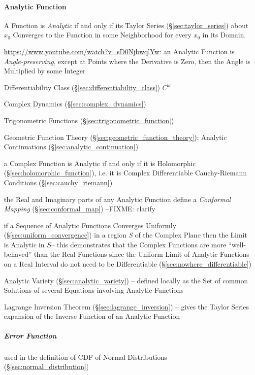 \paragraph{Analytic Function}\label{sec:analytic_function}\hfill

A Function is \emph{Analytic} if and only if its Taylor Series
(\S\ref{sec:taylor_series}) about $x_0$ Converges to the Function in some
Neighborhood for every $x_0$ in its Domain.

\url{https://www.youtube.com/watch?v=sD0NjbwqlYw}: an Analytic Function is
\emph{Angle-preserving}, except at Points where the Derivative is Zero, then the
Angle is Multiplied by some Integer

Differentiability Class (\S\ref{sec:differentiability_class}) $C^{\omega}$

Complex Dynamics (\S\ref{sec:complex_dynamics})

Trigonometric Functions (\S\ref{sec:trigonometric_function})

\fist Geometric Function Theory (\S\ref{sec:geometric_function_theory});
Analytic Continuations (\S\ref{sec:analytic_continuation})

a Complex Function is Analytic if and only if it is Holomorphic
(\S\ref{sec:holomorphic_function}), i.e. it is Complex Differentiable \fist
Cauchy-Riemann Conditions (\S\ref{sec:cauchy_riemann})

the Real and Imaginary parts of any Analytic Function define a \emph{Conformal
  Mapping} (\S\ref{sec:conformal_map}) --FIXME: clarify

if a Sequence of Analytic Functions Converges Uniformly
(\S\ref{sec:uniform_convergence}) in a region $S$ of the Complex Plane then the
Limit is Analytic in $S$-- this demonstrates that the Complex Functions are
more ``well-behaved'' than the Real Functions since the Uniform Limit of
Analytic Functions on a Real Interval do not need to be Differentiable
(\S\ref{sec:nowhere_differentiable})

Analytic Variety (\S\ref{sec:analytic_variety}) -- defined locally as the Set of
common Solutions of several Equations involving Analytic Functions

Lagrange Inversion Theorem (\S\ref{sec:lagrange_inversion}) -- gives the Taylor
Series expansion of the Inverse Function of an Analytic Function



\subparagraph{Error Function}\label{sec:error_function}\hfill

used in the definition of CDF of Normal Distributions
(\S\ref{sec:normal_distribution})



